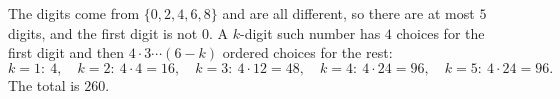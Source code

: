 The digits come from $\{0,2,4,6,8\}$ and are all different, so there are at most $5$ digits, and the first digit is not $0$. A $k$-digit such number has $4$ choices for the first digit and then $4\cdot3\cdots(6-k)$ ordered choices for the rest:
\[k=1:\ 4,\quad k=2:\ 4\cdot4=16,\quad k=3:\ 4\cdot12=48,\quad k=4:\ 4\cdot24=96,\quad k=5:\ 4\cdot24=96.\]
The total is $\boxed{260}$.
